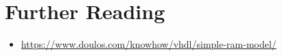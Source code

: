 \documentclass[a4paper, 11pt,oneside]{article}
\begin{document}
\section{Further Reading}
\begin{itemize}
\item 
\href{https://www.doulos.com/knowhow/vhdl/simple-ram-model/}
{https://www.doulos.com/knowhow/vhdl/simple-ram-model/}
\end{itemize}





\nocite{*}
\end{document}
